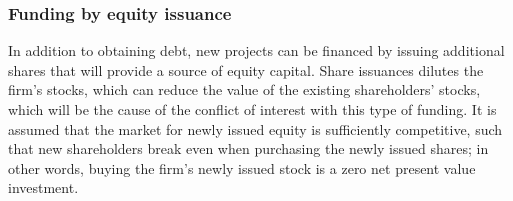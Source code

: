 \documentclass[../main.tex]{subfiles}
\begin{document}
    \subsubsection{Funding by equity issuance}
        In addition to obtaining debt, new projects can be financed by issuing additional shares
        that will provide a source of equity capital.
        Share issuances dilutes the firm's stocks, which can reduce the value of the existing shareholders' stocks,
        which will be the cause of the conflict of interest with this type of funding.
        It is assumed that the market for newly issued equity is sufficiently competitive,
        such that new shareholders break even when purchasing the newly issued shares;
        in other words, buying the firm's newly issued stock is a zero net present value investment.
\end{document}
